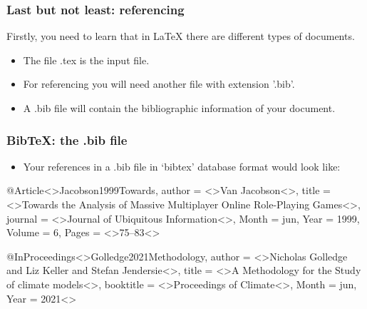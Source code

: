 \begin{frame}[fragile]
\frametitle{Last but not least: referencing}
Firstly, you need to learn that in \LaTeX{} there are different types of documents. 
\begin{itemize}
\item The file .tex is the input file. \\
\item For referencing you will need another file with extension '.bib'. \\
\item A .bib file will contain the bibliographic information of your document. \\
\end{itemize}
\end{frame}

\begingroup
\footnotesize
\begin{frame}[fragile]
\frametitle{BibTeX: the .bib file}
\begin{itemize}
\item Your references in a .bib file in ‘bibtex’ database format would look like:
\end{itemize}
\begin{framed}
\begin{verbnobox}[\vbdelim]
@Article<{>Jacobson1999Towards,
author = <{>Van Jacobson<}>,
title = <{>Towards the Analysis of Massive Multiplayer Online
Role-Playing Games<}>,
journal = <{>Journal of Ubiquitous Information<}>,
Month = jun,
Year = 1999,
Volume = 6,
Pages = <{>75--83<}}>
\end{verbnobox}

\begin{verbnobox}[\vbdelim]
@InProceedings<{>Golledge2021Methodology,
author = <{>Nicholas Golledge and Liz Keller and
Stefan Jendersie<}>,
title = <{>A Methodology for the Study of
climate models<}>,
booktitle = <{>Proceedings of Climate<}>,
Month = jun,
Year = 2021<}>
\end{verbnobox}
\end{framed}
\end{frame}


